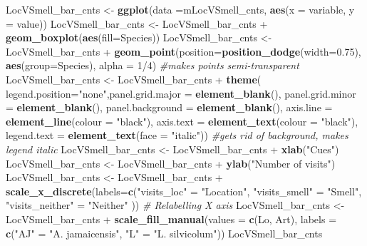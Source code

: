 \documentclass[]{article}
\newenvironment{Shaded}{\begin{snugshade}}{\end{snugshade}}
\newcommand{\KeywordTok}[1]{\textcolor[rgb]{0.13,0.29,0.53}{\textbf{{#1}}}}
\newcommand{\DataTypeTok}[1]{\textcolor[rgb]{0.13,0.29,0.53}{{#1}}}
\newcommand{\DecValTok}[1]{\textcolor[rgb]{0.00,0.00,0.81}{{#1}}}
\newcommand{\FloatTok}[1]{\textcolor[rgb]{0.00,0.00,0.81}{{#1}}}
\newcommand{\StringTok}[1]{\textcolor[rgb]{0.31,0.60,0.02}{{#1}}}
\newcommand{\CommentTok}[1]{\textcolor[rgb]{0.56,0.35,0.01}{\textit{{#1}}}}
\newcommand{\NormalTok}[1]{{#1}}
\begin{document}
\begin{Shaded}
\begin{Highlighting}[]
\NormalTok{LocVSmell_bar_cnts <-}\StringTok{ }\KeywordTok{ggplot}\NormalTok{(}\DataTypeTok{data =}\NormalTok{mLocVSmell_cnts, }\KeywordTok{aes}\NormalTok{(}\DataTypeTok{x =} \NormalTok{variable, }\DataTypeTok{y =} \NormalTok{value))}
\NormalTok{LocVSmell_bar_cnts <-}\StringTok{ }\NormalTok{LocVSmell_bar_cnts +}\StringTok{ }\KeywordTok{geom_boxplot}\NormalTok{(}\KeywordTok{aes}\NormalTok{(}\DataTypeTok{fill=}\NormalTok{Species))}
\NormalTok{LocVSmell_bar_cnts <-}\StringTok{ }\NormalTok{LocVSmell_bar_cnts +}\StringTok{ }\KeywordTok{geom_point}\NormalTok{(}\DataTypeTok{position=}\KeywordTok{position_dodge}\NormalTok{(}\DataTypeTok{width=}\FloatTok{0.75}\NormalTok{), }\KeywordTok{aes}\NormalTok{(}\DataTypeTok{group=}\NormalTok{Species), }\DataTypeTok{alpha =} \DecValTok{1}\NormalTok{/}\DecValTok{4}\NormalTok{) }\CommentTok{#makes points semi-transparent}
\NormalTok{LocVSmell_bar_cnts <-}\StringTok{ }\NormalTok{LocVSmell_bar_cnts +}\StringTok{  }\KeywordTok{theme}\NormalTok{( }\DataTypeTok{legend.position=}\StringTok{"none"}\NormalTok{,}\DataTypeTok{panel.grid.major =} \KeywordTok{element_blank}\NormalTok{(), }\DataTypeTok{panel.grid.minor =} \KeywordTok{element_blank}\NormalTok{(),}
\DataTypeTok{panel.background =} \KeywordTok{element_blank}\NormalTok{(), }\DataTypeTok{axis.line =} \KeywordTok{element_line}\NormalTok{(}\DataTypeTok{colour =} \StringTok{"black"}\NormalTok{), }\DataTypeTok{axis.text =} \KeywordTok{element_text}\NormalTok{(}\DataTypeTok{colour =} \StringTok{"black"}\NormalTok{), }\DataTypeTok{legend.text =} \KeywordTok{element_text}\NormalTok{(}\DataTypeTok{face =} \StringTok{"italic"}\NormalTok{))  }\CommentTok{#gets rid of background, makes legend italic}
\NormalTok{LocVSmell_bar_cnts <-}\StringTok{ }\NormalTok{LocVSmell_bar_cnts +}\StringTok{ }\KeywordTok{xlab}\NormalTok{(}\StringTok{"Cues"}\NormalTok{)}
\NormalTok{LocVSmell_bar_cnts <-}\StringTok{ }\NormalTok{LocVSmell_bar_cnts +}\StringTok{ }\KeywordTok{ylab}\NormalTok{(}\StringTok{"Number of visits"}\NormalTok{)}
\NormalTok{LocVSmell_bar_cnts <-}\StringTok{ }\NormalTok{LocVSmell_bar_cnts +}\StringTok{ }\KeywordTok{scale_x_discrete}\NormalTok{(}\DataTypeTok{labels=}\KeywordTok{c}\NormalTok{(}\StringTok{"visits_loc"} \NormalTok{=}\StringTok{ "Location"}\NormalTok{, }\StringTok{"visits_smell"} \NormalTok{=}\StringTok{ "Smell"}\NormalTok{,}
                              \StringTok{"visits_neither"} \NormalTok{=}\StringTok{ "Neither"} \NormalTok{))  }\CommentTok{# Relabelling X axis}
\NormalTok{LocVSmell_bar_cnts <-}\StringTok{ }\NormalTok{LocVSmell_bar_cnts +}\StringTok{  }\KeywordTok{scale_fill_manual}\NormalTok{(}\DataTypeTok{values =} \KeywordTok{c}\NormalTok{(Lo, Art), }\DataTypeTok{labels =} \KeywordTok{c}\NormalTok{(}\StringTok{"AJ"} \NormalTok{=}\StringTok{ "A. jamaicensis"}\NormalTok{, }\StringTok{"L"} \NormalTok{=}\StringTok{ "L. silvicolum"}\NormalTok{))}
\NormalTok{LocVSmell_bar_cnts}
\end{Highlighting}
\end{Shaded}
\end{document}
